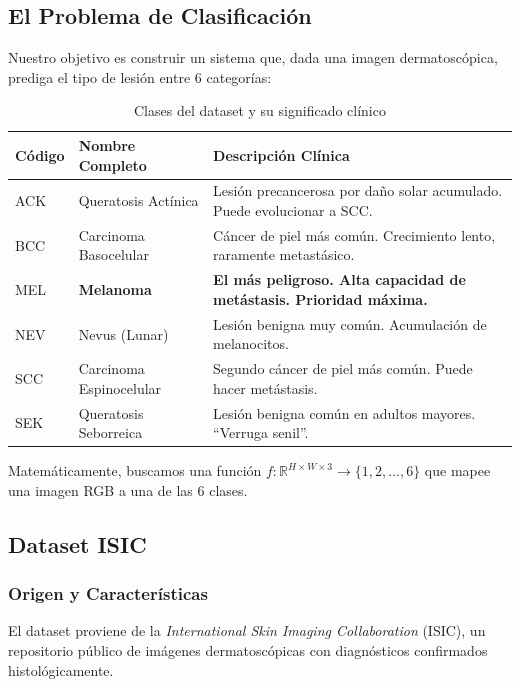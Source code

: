 \documentclass[12pt,a4paper]{article}
\begin{document}
\subsection{El Problema de Clasificación}

Nuestro objetivo es construir un sistema que, dada una imagen dermatoscópica, prediga el tipo de lesión entre 6 categorías:

\begin{table}[H]
\centering
\caption{Clases del dataset y su significado clínico}
\label{tab:clases}
\begin{tabular}{@{}llp{6.5cm}@{}}
\toprule
\textbf{Código} & \textbf{Nombre Completo} & \textbf{Descripción Clínica} \\
\midrule
ACK & Queratosis Actínica & Lesión precancerosa por daño solar acumulado. Puede evolucionar a SCC. \\
BCC & Carcinoma Basocelular & Cáncer de piel más común. Crecimiento lento, raramente metastásico. \\
\rowcolor{red!10} MEL & \textbf{Melanoma} & \textbf{El más peligroso. Alta capacidad de metástasis. Prioridad máxima.} \\
NEV & Nevus (Lunar) & Lesión benigna muy común. Acumulación de melanocitos. \\
SCC & Carcinoma Espinocelular & Segundo cáncer de piel más común. Puede hacer metástasis. \\
SEK & Queratosis Seborreica & Lesión benigna común en adultos mayores. ``Verruga senil''. \\
\bottomrule
\end{tabular}
\end{table}

Matemáticamente, buscamos una función $f: \mathbb{R}^{H \times W \times 3} \rightarrow \{1, 2, ..., 6\}$ que mapee una imagen RGB a una de las 6 clases.

\subsection{Dataset ISIC}

\subsubsection{Origen y Características}

El dataset proviene de la \textit{International Skin Imaging Collaboration} (ISIC), un repositorio público de imágenes dermatoscópicas con diagnósticos confirmados histológicamente.
\end{document}

